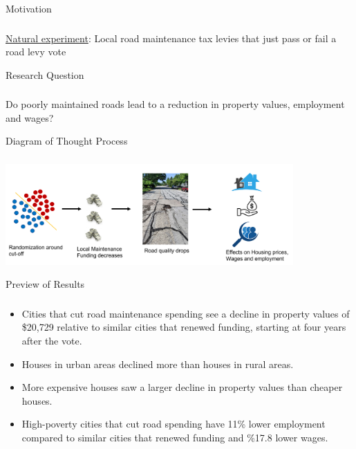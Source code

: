 \documentclass{beamer}
\begin{document}
\begin{frame}{Motivation}
\frametitle{}

\underline{Natural experiment}: Local road maintenance tax levies that just pass or fail a road levy vote

\end{frame}

\begin{frame}{Research Question}
        \frametitle{}
        Do poorly maintained roads lead to a reduction in property values, employment and wages?
        
\end{frame}

\begin{frame}{Diagram of Thought Process} 
\frametitle{}
        \includegraphics[width=11cm]{assets/imgs/thought_process.png}

\end{frame}

\begin{frame}{Preview of Results}
\frametitle{}

\begin{itemize}
    \item Cities that cut road maintenance spending see a decline in property values of \$20,729 relative to similar cities that renewed funding, starting at four years after the vote.
    \item Houses in urban areas declined more than houses in rural areas.
    \item More expensive houses saw a larger decline in property values than cheaper houses.    
    \item High-poverty cities that cut road spending have 11\% lower employment compared to similar cities that renewed funding and \%17.8 lower wages.    
\end{itemize}
        
\end{frame}
\end{document}
